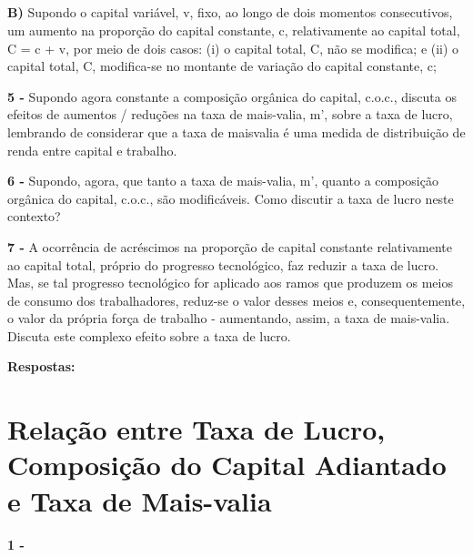 \documentclass[a4paper, 12pt]{article} %
\begin{document}
\subparagraph{} \textbf{B)} Supondo o capital variável, v, fixo, ao longo de dois momentos consecutivos, um aumento na
proporção do capital constante, c, relativamente ao capital total, C = c + v, por meio de dois
casos: (i) o capital total, C, não se modifica; e (ii) o capital total, C, modifica-se no montante de
variação do capital constante, c;

\vspace{0.5cm}

\par \textbf{5 -}  Supondo agora constante a composição orgânica do capital, c.o.c., discuta os efeitos de aumentos /
reduções na taxa de mais-valia, m’, sobre a taxa de lucro, lembrando de considerar que a taxa de maisvalia é uma medida de distribuição de renda entre capital e trabalho.

\vspace{0.5cm}

\par \textbf{6 -} Supondo, agora, que tanto a taxa de mais-valia, m’, quanto a composição orgânica do capital, c.o.c.,
são modificáveis. Como discutir a taxa de lucro neste contexto?

\vspace{0.5cm}

\par \textbf{7 - }  A ocorrência de acréscimos na proporção de capital constante relativamente ao capital total, próprio
do progresso tecnológico, faz reduzir a taxa de lucro. Mas, se tal progresso tecnológico for aplicado aos
ramos que produzem os meios de consumo dos trabalhadores, reduz-se o valor desses meios e,
consequentemente, o valor da própria força de trabalho - aumentando, assim, a taxa de mais-valia.
Discuta este complexo efeito sobre a taxa de lucro.

\vspace{0.5cm}

\begin{center}
\textbf{Respostas:}
\end{center}

\section{Relação entre Taxa de Lucro, Composição do Capital Adiantado e Taxa de Mais-valia}

\par \textbf{1 -}
\end{document}
